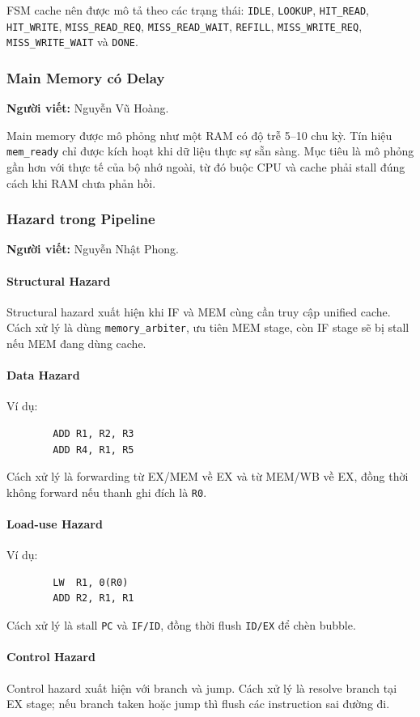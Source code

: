 \documentclass[11pt,a4paper]{article}
\theoremstyle{definition}
\theoremstyle{remark}
\begin{document}
	FSM cache nên được mô tả theo các trạng thái: \texttt{IDLE}, \texttt{LOOKUP}, \texttt{HIT\_READ}, \texttt{HIT\_WRITE}, \texttt{MISS\_READ\_REQ}, \texttt{MISS\_READ\_WAIT}, \texttt{REFILL}, \texttt{MISS\_WRITE\_REQ}, \texttt{MISS\_WRITE\_WAIT} và \texttt{DONE}.
	
	\subsubsection{Main Memory có Delay}
	\textbf{Người viết:} Nguyễn Vũ Hoàng.
	
	Main memory được mô phỏng như một RAM có độ trễ 5--10 chu kỳ. Tín hiệu \texttt{mem\_ready} chỉ được kích hoạt khi dữ liệu thực sự sẵn sàng. Mục tiêu là mô phỏng gần hơn với thực tế của bộ nhớ ngoài, từ đó buộc CPU và cache phải stall đúng cách khi RAM chưa phản hồi.
	
	\subsubsection{Hazard trong Pipeline}
	\textbf{Người viết:} Nguyễn Nhật Phong.
	
	\paragraph{Structural Hazard}
	Structural hazard xuất hiện khi IF và MEM cùng cần truy cập unified cache. Cách xử lý là dùng \texttt{memory\_arbiter}, ưu tiên MEM stage, còn IF stage sẽ bị stall nếu MEM đang dùng cache.
	
	\paragraph{Data Hazard}
	Ví dụ:
	\begin{verbatim}
		ADD R1, R2, R3
		ADD R4, R1, R5
	\end{verbatim}
	Cách xử lý là forwarding từ EX/MEM về EX và từ MEM/WB về EX, đồng thời không forward nếu thanh ghi đích là \texttt{R0}.
	
	\paragraph{Load-use Hazard}
	Ví dụ:
	\begin{verbatim}
		LW  R1, 0(R0)
		ADD R2, R1, R1
	\end{verbatim}
	Cách xử lý là stall \texttt{PC} và \texttt{IF/ID}, đồng thời flush \texttt{ID/EX} để chèn bubble.
	
	\paragraph{Control Hazard}
	Control hazard xuất hiện với branch và jump. Cách xử lý là resolve branch tại EX stage; nếu branch taken hoặc jump thì flush các instruction sai đường đi.
	
\end{document}
